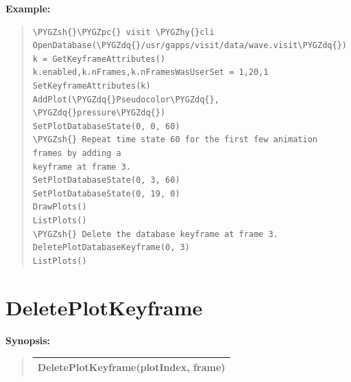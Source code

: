 \documentclass[letterpaper,10pt,english]{sphinxmanual}
\def\PYGZsh{\char`\#}
\def\PYGZpc{\char`\%}
\def\PYGZhy{\char`\-}
\def\PYGZdq{\char`\"}
\begin{document}
\begin{DUlineblock}{0em}
\item[] \textbf{Example:}
\item[] 
\end{DUlineblock}
\begin{quote}

\begin{Verbatim}[commandchars=\\\{\}]
\PYGZsh{}\PYGZpc{} visit \PYGZhy{}cli
OpenDatabase(\PYGZdq{}/usr/gapps/visit/data/wave.visit\PYGZdq{})
k = GetKeyframeAttributes()
k.enabled,k.nFrames,k.nFramesWasUserSet = 1,20,1
SetKeyframeAttributes(k)
AddPlot(\PYGZdq{}Pseudocolor\PYGZdq{}, \PYGZdq{}pressure\PYGZdq{})
SetPlotDatabaseState(0, 0, 60)
\PYGZsh{} Repeat time state 60 for the first few animation frames by adding a
keyframe at frame 3.
SetPlotDatabaseState(0, 3, 60)
SetPlotDatabaseState(0, 19, 0)
DrawPlots()
ListPlots()
\PYGZsh{} Delete the database keyframe at frame 3.
DeletePlotDatabaseKeyframe(0, 3)
ListPlots()
\end{Verbatim}
\end{quote}


\section{DeletePlotKeyframe}
\label{functions:deleteplotkeyframe}
\begin{DUlineblock}{0em}
\item[] \textbf{Synopsis:}
\end{DUlineblock}
\begin{quote}

\begin{tabulary}{\linewidth}{|L|}
\hline

DeletePlotKeyframe(plotIndex, frame)
\\
\hline\end{tabulary}

\end{quote}
\end{document}

